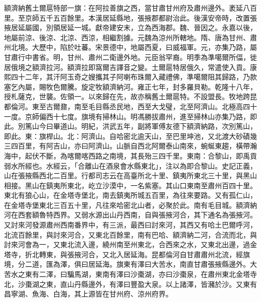 \begin{pinyinscope}
額濟納舊土爾扈特部一旗：在阿拉善旗之西，當甘肅甘州府及肅州邊外。袤延八百里。至京師五千五百餘里。本漢居延縣地，張掖郡都尉治此。後漢安帝時，改置張掖居延屬國，別領居延一城。獻帝建安末，立為西海郡。魏、晉因之。永嘉以後，地屬前涼、後涼、北涼、西涼，相繼割據。元魏為涼州所轄地。隋、唐為甘州、肅州北境。大歷中，陷於吐蕃。宋景德中，地屬西夏，曰威福軍。元，亦集乃路，屬甘肅行中書省。明，甘州、肅州二衛邊外地。元臣翁罕裔。明季為準噶爾所偪，徙居俄境之額濟拉河。額濟拉即窩爾吉譯音之變。土爾扈特居俄久，常遣使入貢。康熙四十二年，其汗阿玉奇之嫂攜其子阿喇布珠爾入藏禮佛，準噶爾阻其歸路，乃款塞乞內屬，賜牧色爾騰。旋定牧額濟納河。雍正七年，封多羅貝勒。乾隆十八年，授札薩克，世襲。佐領一。以來歸在先，故亦稱舊土爾扈特。不設盟長。牧地跨昆都倫河。東至古爾鼐，南至毛目縣丞民地，西至大戈璧，北至阿濟山。北極高四十一度。京師偏西十七度。旗境有掃林山。明馮勝拔肅州，進至掃林山亦集乃路，即此。別篤山今曰畢道山。明紀，洪武五年，副將軍傅友德下額濟納路，次別篤山，即此。東：旗桿山。北：阿濟山。自哈密北逾天山，至巴里坤池，又北渡大砂磧幾三四百里，有阿吉山，亦曰阿濟山。山脈自西北阿爾泰山南來，蜿蜒東趨，橫帶瀚海中，起伏不斷，為喀爾喀西路之南境，其長殆三四千里。東南：合黎山，即禹貢弱水所經也。水經云，「合離山在酒泉會水縣東北」，注以為即合黎山。史記正義，山在張掖縣西北二百里。行都司志云在高臺所北十里、鎮夷所東北三十里，與黑山相接。黑山在鎮夷所東北，屹立沙漠中，一名紫塞。其山口東南至肅州百四十里。東北有狼心山，在金塔寺堡北，南去鎮夷所城五百里，為往來要路。又有孤仁山，在金塔寺堡東北三百五十里，凡往來哈密北山者，必聚於此。南有毛目城。額濟納河在西套額魯特西界。又弱水源出山丹西南，自與張掖河合，其下通名為張掖河。又討來河發源肅州西南番界中，有三派，最西曰討來河，其西又有哈土巴爾呼河，北流百餘里，與討來河合，又東北百餘里，南有巴哈、額濟納二河，合流而北，與討來河會為一，又東北流入邊，繞州南至州東北，合西來之水，又東北出邊，過金塔寺，折北轉東，與張掖河合，又北入居延海。昆都倫河自甘肅肅州北流，經旗境，分二道，匯為澤，俱曰居延海。旗東有澤曰大苦水，南直甘肅張掖縣邊外。大苦水之東有二澤，曰騙馬湖，東南有澤曰沙棗湖，亦曰沙棗泉，在肅州東北金塔寺北，沙棗湖之東，直山丹縣邊外，有澤曰豐盈大泉。以上諸澤，皆瀦於沙。又東有昌寧湖、魚海、白海，其上源皆在甘州府、涼州府界。


\end{pinyinscope}
